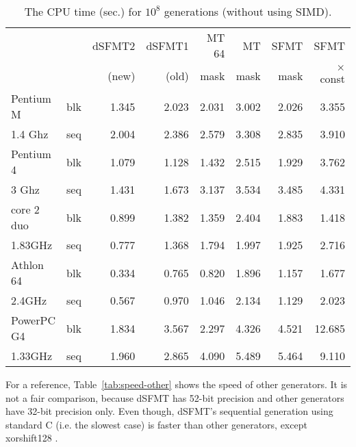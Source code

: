 \documentclass{svmult}
\begin{document}
\begin{table}
  \begin{center}
    \caption{The CPU time (sec.) for $10^8$ generations (without using SIMD).}
    \label{tab:speed-c}
    \begin{tabular}{|ll|r|r|r|r|r|r|} \hline
      &  & dSFMT2 & dSFMT1 & MT 64 & MT & SFMT & SFMT \\
      &  &(new)&(old)& mask & mask & mask & $\times$ const \\ \hline\hline
      Pentium M & blk & 1.345 & 2.023 & 2.031 & 3.002 & 2.026 & 3.355 \\
      1.4 Ghz & seq & 2.004 & 2.386 & 2.579 & 3.308 & 2.835 & 3.910 \\ \hline
      Pentium 4 & blk & 1.079 & 1.128 & 1.432 & 2.515 & 1.929 & 3.762 \\
      3 Ghz & seq & 1.431 & 1.673 & 3.137 & 3.534 & 3.485 & 4.331 \\ \hline
      core 2 duo & blk & 0.899 & 1.382 & 1.359 & 2.404 & 1.883 & 1.418 \\
      1.83GHz & seq & 0.777 & 1.368 & 1.794 & 1.997 & 1.925 & 2.716 \\ \hline
      Athlon 64 & blk & 0.334 & 0.765 & 0.820 & 1.896 & 1.157 & 1.677 \\
      2.4GHz & seq & 0.567 & 0.970 & 1.046 & 2.134 & 1.129 & 2.023 \\ \hline
      PowerPC G4 & blk & 1.834 & 3.567 & 2.297 & 4.326 & 4.521 & 12.685 \\
      1.33GHz & seq & 1.960 & 2.865 & 4.090 & 5.489 & 5.464 & 9.110 \\ \hline
    \end{tabular}
  \end{center}
\end{table}

For a reference, Table~\ref{tab:speed-other} shows the speed of other
generators. It is not a fair comparison, 
because dSFMT has 52-bit precision and other generators have 32-bit
precision only. Even though, dSFMT's sequential generation using standard
C (i.e. the slowest case) is faster than other generators, except xorshift128
\cite{XORSHIFT-MAR}.
\end{document}
